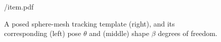 \begin{figure}[t]
\centering
\begin{overpic} 
[width=\linewidth]
{\currfiledir/item.pdf}
\myfigurename{}
\end{overpic}
\caption{
% 
A posed sphere-mesh tracking template (right), and its corresponding (left) pose $\theta$ and (middle) shape $\beta$ degrees of freedom. 
% 
}
\label{fig:handymodel}
\end{figure}
